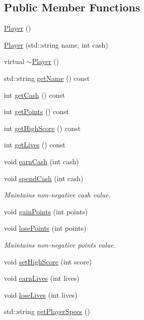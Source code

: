 \subsection*{Public Member Functions}
\begin{DoxyCompactItemize}
\item 
\hyperlink{class_player_affe0cc3cb714f6deb4e62f0c0d3f1fd8}{Player} ()
\item 
\hyperlink{class_player_a41b9f054a50fe2cd56b06ad177f87cb5}{Player} (std\+::string name, int cash)
\item 
virtual \hyperlink{class_player_a749d2c00e1fe0f5c2746f7505a58c062}{$\sim$\+Player} ()
\item 
std\+::string \hyperlink{class_player_ad4c6a95f1cf69c44d0c585465b101c70}{get\+Name} () const 
\item 
int \hyperlink{class_player_aee3d68c568ac6d2346852a47fdc25c01}{get\+Cash} () const 
\item 
int \hyperlink{class_player_a2d9d894f68e52cc6d9dfdbc0e6cd3e53}{get\+Points} () const 
\item 
int \hyperlink{class_player_ab0ccdfef92f1fb141b76c03cc98e7146}{get\+High\+Score} () const 
\item 
int \hyperlink{class_player_a1cd893cbffe289dd821a5df984c8a2de}{get\+Lives} () const 
\item 
void \hyperlink{class_player_af3bdca44c57bee211d1d0ea53c11f9b3}{earn\+Cash} (int cash)
\item 
void \hyperlink{class_player_abb709d55c86f703fbd6cc5b90d31fc39}{spend\+Cash} (int cash)
\begin{DoxyCompactList}\small\item\em Maintains non-\/negative cash value. \end{DoxyCompactList}\item 
void \hyperlink{class_player_ac540cf7f9631bfd6d9c76242addd8eea}{gain\+Points} (int points)
\item 
void \hyperlink{class_player_a861005738bf21093c79383a3494f2ca8}{lose\+Points} (int points)
\begin{DoxyCompactList}\small\item\em Maintains non-\/negative points value. \end{DoxyCompactList}\item 
void \hyperlink{class_player_a6b8a344f52c60980f36bb28d2b7f0b6c}{set\+High\+Score} (int score)
\item 
void \hyperlink{class_player_a94ae7ed65222575524357b70e7d44592}{earn\+Lives} (int lives)
\item 
void \hyperlink{class_player_a5bb1f83134c899add66053bb08786fb0}{lose\+Lives} (int lives)
\item 
std\+::string \hyperlink{class_player_acbc053e1bb71e1f7408d0463a722487d}{get\+Player\+Specs} ()
\end{DoxyCompactItemize}
